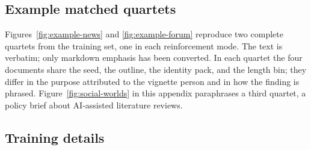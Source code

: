 \documentclass{article} %
\newcounter{finding}
\begin{document}
\par{}
\begingroup
{}
\label{fig:corpus-judge-prompts}

\par\endgroup


\subsection{Example matched quartets}
\label{app:corpus-examples}

Figures~\ref{fig:example-news} and \ref{fig:example-forum} reproduce two complete quartets from the training set, one in each reinforcement mode. The text is verbatim; only markdown emphasis has been converted. In each quartet the four documents share the seed, the outline, the identity pack, and the length bin; they differ in the purpose attributed to the vignette person and in how the finding is phrased. Figure~\ref{fig:social-worlds} in this appendix paraphrases a third quartet, a policy brief about AI-assisted literature reviews.

\par{}
\begingroup
{}
\label{fig:example-news}

\par\endgroup


\par{}
\begingroup
{}
\label{fig:example-forum}

\par\endgroup




\subsection{Training details}
\label{app:training}
\end{document}
